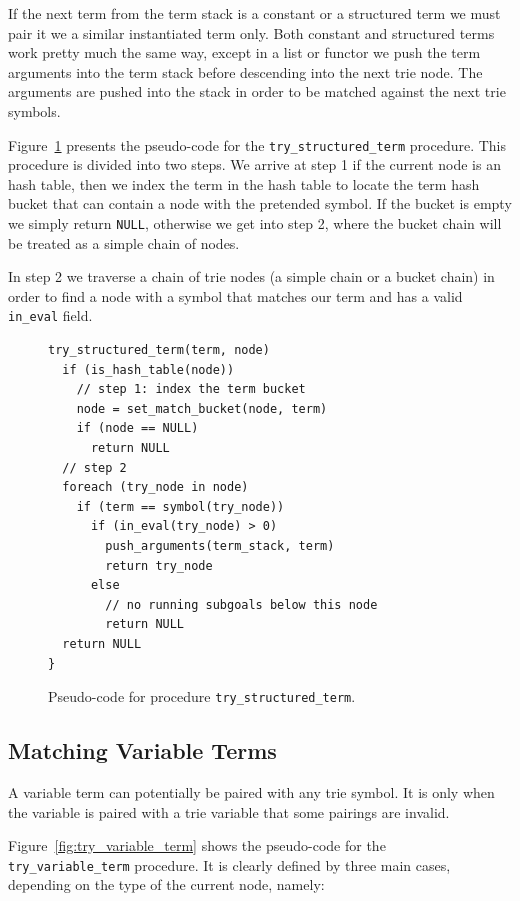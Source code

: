 If the next term from the term stack is a constant or a structured term we must pair it we
a similar instantiated term only. Both constant and structured terms work pretty much the
same way, except in a list or functor we push the term arguments into the term stack
before descending into the next trie node. The arguments are pushed into the stack in order
to be matched against the next trie symbols.

Figure~\ref{fig:try_structured_term} presents the pseudo-code
for the \texttt{try\_structured\_term} procedure.  This procedure is divided into two steps.
We arrive at step 1 if the current node is an hash table, then we index the term in the hash table
to locate the term hash bucket that can contain a node with the pretended symbol.
If the bucket is empty we simply return \texttt{NULL}, otherwise we get into step 2, where the bucket
chain will be treated as a simple chain of nodes.

In step 2 we traverse a chain of trie nodes (a simple chain or a bucket chain) in order to find a
node with a symbol that matches our term and has a valid \texttt{in\_eval} field.

\begin{figure}[ht]
\begin{Verbatim}
try_structured_term(term, node)
  if (is_hash_table(node))
    // step 1: index the term bucket
    node = set_match_bucket(node, term)
    if (node == NULL)
      return NULL
  // step 2
  foreach (try_node in node)
    if (term == symbol(try_node))
      if (in_eval(try_node) > 0)
        push_arguments(term_stack, term)
        return try_node
      else
        // no running subgoals below this node
        return NULL
  return NULL
}
\end{Verbatim}
\caption{Pseudo-code for procedure \texttt{try\_structured\_term}.}
\label{fig:try_structured_term}
\end{figure}

\subsection{Matching Variable Terms}

A variable term can potentially be paired with any trie symbol. It is only
when the variable is paired with a trie variable that some pairings are invalid.

Figure~\ref{fig:try_variable_term} shows the pseudo-code for the
\texttt{try\_variable\_term} procedure. It is clearly defined by three main cases,
depending on the type of the current node, namely:

